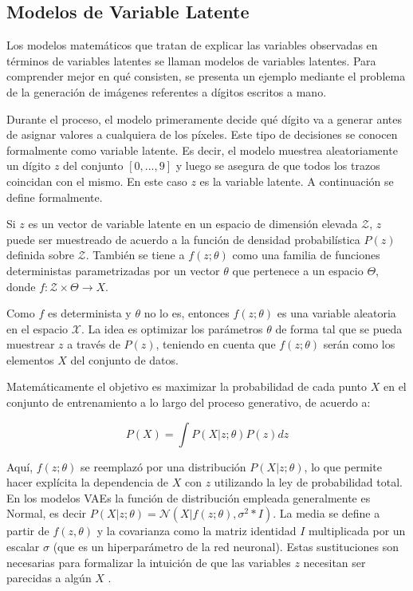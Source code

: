 \subsection{Modelos de Variable Latente}\label{1-latentVarModel}

Los modelos matemáticos que tratan de explicar las variables observadas en términos de variables latentes se llaman modelos de variables latentes. Para comprender mejor en qué consisten, se presenta un ejemplo mediante el problema de la generación de imágenes referentes a dígitos escritos a mano.

 Durante el proceso, el modelo primeramente decide qué dígito va a generar antes de asignar valores a cualquiera de los píxeles. Este tipo de decisiones se conocen formalmente como variable latente. Es decir, el modelo muestrea aleatoriamente un dígito $z$ del conjunto $[0, ..., 9]$ y luego se asegura de que todos los trazos coincidan con el mismo. En este caso $z$ es la variable latente. A continuación se define formalmente.
 
 Si $z$ es un vector de variable latente en un espacio de dimensión elevada $\mathcal{Z}$, $z$ puede ser muestreado de acuerdo a la función de densidad probabilística $P(z)$ definida sobre $\mathcal{Z}$. También se tiene a $f(z; \theta)$ como una familia de funciones deterministas parametrizadas por un vector $\theta$ que pertenece a un espacio $\Theta$, donde $f: \mathcal{Z} \times \Theta \rightarrow X$.
 
  Como $f$ es determinista y $\theta$ no lo es, entonces $f(z; \theta)$ es una variable aleatoria en el espacio $\mathcal{X}$. La idea es optimizar los parámetros $\theta$ de forma tal que se pueda muestrear $z$ a través de $P(z)$, teniendo en cuenta que $f(z; \theta)$ serán como los elementos $X$ del conjunto de datos. 
 
 Matemáticamente el objetivo es maximizar la probabilidad de cada punto $X$ en el conjunto de entrenamiento a lo largo del proceso generativo, de acuerdo a:
 
 \begin{equation}
 	P(X) = \displaystyle{\int} P(X| z; \theta)P(z)dz
 \end{equation} 
 
 Aquí, $f(z; \theta)$ se reemplazó por una distribución $P(X| z; \theta)$, lo que permite hacer explícita la dependencia de $X$ con $z$ utilizando la ley de probabilidad total. En los modelos VAEs la función de distribución empleada generalmente  es Normal, es decir $P(X|z;\theta) = \mathcal{N}(X|f(z; \theta), \sigma^2*I)$. La media se define a partir de $f(z, \theta)$ y la covarianza como la matriz identidad $I$ multiplicada por un escalar $\sigma$ (que es un hiperparámetro de la red neuronal). Estas sustituciones son necesarias para formalizar la intuición de que las variables $z$ necesitan ser parecidas a algún $X$ \cite{VAETutorial}. 
 
